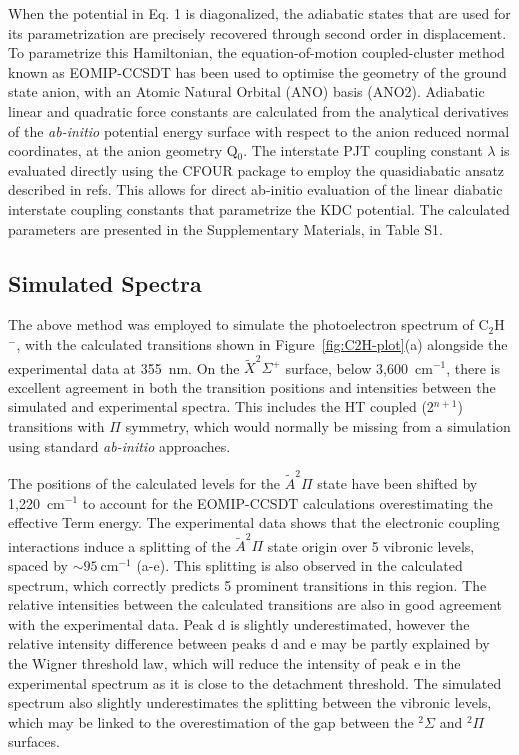 \documentclass[journal=jpcafh,manuscript=article,layout=onecolumn, 12pt]{achemso}
\begin{document}
When the potential in Eq. 1 is diagonalized, the adiabatic states that are used for its parametrization are precisely recovered through second order in displacement. To parametrize this Hamiltonian, the equation-of-motion coupled-cluster method known as EOMIP-CCSDT has been used to optimise the geometry of the ground state anion, with an Atomic Natural Orbital (ANO) basis (ANO2). Adiabatic linear and quadratic force constants are calculated from the analytical derivatives of the \emph{ab-initio} potential energy surface with respect to the anion reduced normal coordinates, at the anion geometry Q$_0$. The interstate PJT coupling constant $\lambda$ is evaluated directly using the CFOUR package to employ the quasidiabatic ansatz described in refs. This allows for direct ab-initio evaluation of the linear diabatic interstate coupling constants that parametrize the KDC potential. The calculated parameters are presented in the Supplementary Materials, in Table S1.   



\subsection{Simulated Spectra}
The above method was employed to simulate the photoelectron spectrum of C$_2$H$^-$, with the calculated transitions shown in Figure~\ref{fig:C2H-plot}(a) alongside the experimental data at 355~nm. %
On the $\tilde{X} ^2\Sigma^+$ surface, below 3,600~cm$^{-1}$, there is excellent agreement in both the transition positions and intensities between the simulated and experimental spectra. This includes the HT coupled (2$^{n+1}$) transitions with $\Pi$ symmetry, which would normally be missing from a simulation using standard \emph{ab-initio} approaches. 

The positions of the calculated levels for the $\tilde{A}^2\Pi$ state have been shifted by 1,220~cm$^{-1}$ to account for the EOMIP-CCSDT calculations overestimating the effective Term energy. The experimental data shows that the electronic coupling interactions induce a splitting of the $\tilde{A} ^2\Pi$ state origin over 5 vibronic levels, spaced by $\sim 95~$cm$^{-1}$ (a-e). This splitting is also observed in the calculated spectrum, which correctly predicts 5 prominent transitions in this region. The relative intensities between the calculated transitions are also in good agreement with the experimental data. Peak d is slightly underestimated, however the relative intensity difference between peaks d and e may be partly explained by the Wigner threshold law, which will reduce the intensity of peak e in the experimental spectrum as it is close to the detachment threshold. The simulated spectrum also slightly underestimates the splitting between the vibronic levels, which may be linked to the overestimation of the gap between the $^2\Sigma$ and $^2\Pi$ surfaces.
\end{document}
